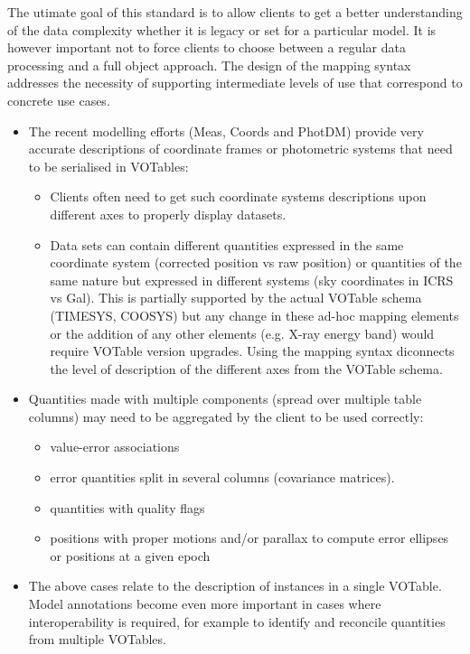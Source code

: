 
The utimate goal of this standard is to allow clients to get a better understanding of the data complexity whether it is legacy or set for a particular model. It is however important not to force clients to choose between a regular data processing and a full object approach.
The design of the mapping syntax addresses the necessity of supporting intermediate levels of use that correspond to concrete use cases.

\begin{itemize}
  \item The recent modelling efforts (Meas, Coords and PhotDM) provide very accurate descriptions of coordinate frames or photometric 
        systems that need to be serialised in VOTables:
  \begin{itemize}
    \item Clients often need to get such coordinate systems descriptions upon different axes to properly display datasets. 
    \item Data sets can contain different quantities expressed in the same coordinate system (corrected position vs raw position) or 
          quantities of the same nature but expressed in different systems (sky coordinates in ICRS vs Gal). 
          This is partially supported by the actual VOTable schema (TIMESYS, COOSYS) but any change in these ad-hoc mapping 
          elements or the addition of any other elements (e.g. X-ray energy band) would require VOTable version upgrades. 
          Using the mapping syntax diconnects the level of description of the different axes from the VOTable schema.           
  \end{itemize} 
  
  \item Quantities made with multiple components (spread over multiple table columns) may need to be aggregated by the client to be used correctly:
  \begin{itemize}
    \item value-error associations
    \item error quantities split in several columns (covariance matrices). 
    \item quantities with quality flags
    \item positions with proper motions and/or parallax to compute error ellipses or positions at a given epoch
  \end{itemize} 

  \item The above cases relate to the description of instances in a
  single VOTable. Model annotations become even more important in cases
  where interoperability is required, for example to identify and
  reconcile quantities from multiple VOTables.


\end{itemize}
